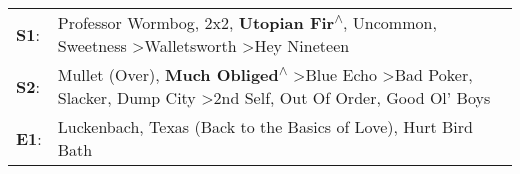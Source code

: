 \begin{supertabular}{p{0.03\textwidth}p{0.92\textwidth}}
 \textbf{S1}:  &                                                                                            Professor Wormbog\textsuperscript{}, \enspace 2x2\textsuperscript{}, \enspace \textbf{Utopian Fir\textsuperscript{$\wedge$}}, \enspace Uncommon\textsuperscript{}, \enspace Sweetness\textsuperscript{} \textgreater \enspace Walletsworth\textsuperscript{} \textgreater \enspace Hey Nineteen\textsuperscript{}  \enspace  \\
 \textbf{S2}:  &  Mullet (Over)\textsuperscript{}, \enspace \textbf{Much Obliged\textsuperscript{$\wedge$}} \textgreater \enspace Blue Echo\textsuperscript{} \textgreater \enspace Bad Poker\textsuperscript{}, \enspace Slacker\textsuperscript{}, \enspace Dump City\textsuperscript{} \textgreater \enspace 2nd Self\textsuperscript{}, \enspace Out Of Order\textsuperscript{}, \enspace Good Ol' Boys\textsuperscript{}  \enspace  \\
 \textbf{E1}:  &                                                                                                                                                                                                                                                                                                  Luckenbach, Texas (Back to the Basics of Love)\textsuperscript{}, \enspace Hurt Bird Bath\textsuperscript{}  \enspace  \\
\end{supertabular}
